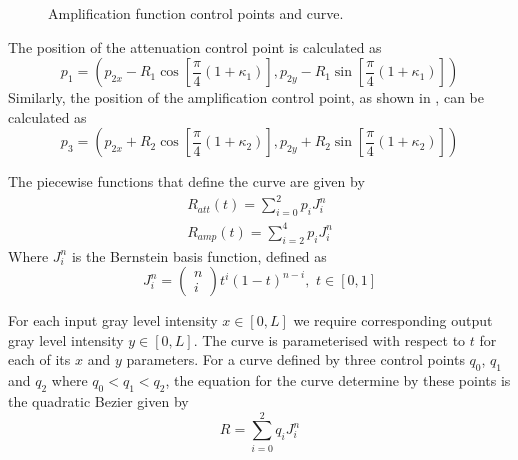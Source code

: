 \begin{definition}
	\begin{figure}[!t]
		\centering
		\caption{Amplification function control points and curve.}
		\label{fig:ampcalculation}
	\end{figure}

	The position of the attenuation control point is calculated as
	\begin{equation*}
		{p_1} = \left(
		p_{2x} - R_1\cos[\frac{\pi}{4}(1+\kappa_1)],
		p_{2y} - R_1\sin[\frac{\pi}{4}(1+\kappa_1)]
		\right)
	\end{equation*}
	Similarly, the position of the amplification control point, as shown in , can be calculated as
	\begin{equation*}
		{p_3} = \left(
		p_{2x} + R_2\cos[\frac{\pi}{4}(1+\kappa_2)],
		p_{2y} + R_2\sin[\frac{\pi}{4}(1+\kappa_2)]
		\right)
	\end{equation*}
	
	The piecewise functions that define the curve are given by	
	\begin{eqnarray}
		R_{att}(t) = \sum_{i=0}^2 p_i J_i^n \\
		R_{amp}(t) = \sum_{i=2}^4 p_i J_i^n
	\end{eqnarray}
	Where $J_i^n$ is the Bernstein basis function, defined as
	\begin{equation}
	J_i^n = \begin{pmatrix}
	n \\
	i
	\end{pmatrix}	
	t^i(1-t)^{n-i}, \,\, t \in [0,1]
	\label{eq:bernsteinbasis}
	\end{equation}
	
	For each input gray level intensity $x \in [0, L]$ we require corresponding output gray level intensity $y \in [0, L]$.
	The curve is parameterised with respect to $t$ for each of its $x$ and $y$ parameters.
	For a curve defined by three control points $q_0$, $q_1$ and $q_2$ where $q_0 < q_1 < q_2$, the equation for the curve determine by these points is the quadratic Bezier given by
	\begin{equation}
		R = \sum_{i=0}^2 q_i J_i^n
	\end{equation}
	

\end{definition}
